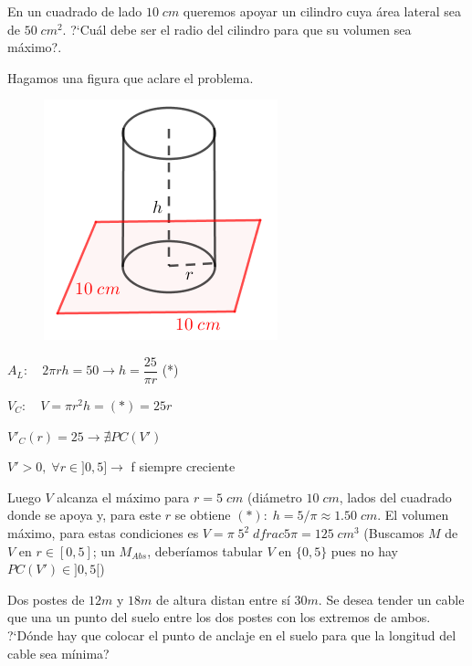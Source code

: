 	\begin{ejre} En un cuadrado de lado $10\; cm$ queremos apoyar un cilindro cuya área lateral sea de $50 \; cm^2$. ?`Cuál debe ser el radio del cilindro para que su volumen sea máximo?.
		
	\end{ejre}
	
	\begin{proofw}\renewcommand{\qedsymbol}{$\diamond$}
	
	Hagamos una figura que aclare el problema.
	
	\begin{multicols}{2}
	
	\begin{figure}[H]
	\centering
	\includegraphics[width=.25\textwidth]{imagenes/imagenes05/T05IM18.png}
	\end{figure}
	
	$A_L: \quad  2\pi r h = 50 \to h=\dfrac {25}{\pi r}$ (*)
	
	$V_C: \quad V = \pi r^2 h = (*) = 25 r$
	
	$V'_C(r)=25 \to \nexists PC(V')$
	
	$V'>0, \; \forall r\in ]0,5] \to $ f siempre creciente
		
	\end{multicols}
	
	Luego $V$ alcanza el máximo para $r=5\; cm$ (diámetro $10\; cm$, lados del cuadrado donde se apoya y, para este $r$ se obtiene $(*):\; h=5 / \pi \approx 1.50\; cm$. El volumen máximo, para estas condiciones es $V=\pi \; 5^2\; dfrac {5}{\pi}= 125 \; cm^3 $  (Buscamos $M$ de $V$ en $r\in[0,5]$; un $M_{Abs}$, deberíamos tabular $V$ en $\{0,5\}$ pues no hay $PC(V')\in]0,5[$)
	
	\end{proofw}
	
	\begin{ejre} Dos postes de $12m$ y $18m$ de altura distan entre sí $30m$. Se desea tender un cable que una un punto del suelo entre los dos postes con los extremos de ambos. ?`Dónde hay que colocar el punto de anclaje en el suelo para que la longitud del cable sea mínima?
		
	\end{ejre}
	
